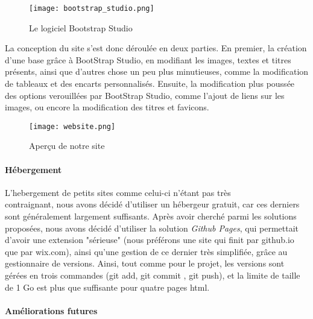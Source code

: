             \begin{figure}[hbt!]
                \centering
                \texttt{[image: bootstrap\_studio.png]}
                \caption{Le logiciel Bootstrap Studio}
            \end{figure}

            La conception du site s'est donc déroulée en deux parties. En premier, la création
            d'une base grâce à BootStrap Studio, en modifiant les images, textes et titres présents, ainsi
            que d'autres chose un peu plus minutieuses, comme la modification de tableaux et des encarts personnalisés.
            Ensuite, la modification plus poussée des options verouillées par BootStrap Studio, comme l'ajout de liens 
            sur les images, ou encore la modification des titres et favicons.

            \begin{figure}[hbt!]
                \centering
                \texttt{[image: website.png]}
                \caption{Aperçu de notre site}
            \end{figure}
            \FloatBarrier


        \paragraph{Hébergement}

            L'hebergement de petits sites comme celui-ci n'étant pas très \\
            contraignant, nous avons décidé d'utiliser un hébergeur gratuit, 
            car ces derniers sont généralement largement suffisants. Après 
            avoir cherché parmi les solutions proposées, nous avons décidé 
            d'utiliser la solution \textit{Github Pages}, qui permettait 
            d'avoir une extension "sérieuse" (nous préférons une site qui 
            finit par github.io que par wix.com), ainsi qu'une gestion de ce 
            dernier très simplifiée, grâce au gestionnaire de versions. Ainsi, 
            tout comme pour le projet, les versions sont gérées en trois 
            commandes (git add, git commit , git push), et la limite de taille 
            de 1 Go est plus que suffisante pour quatre pages html. 
            

        
        \paragraph{Améliorations futures}

